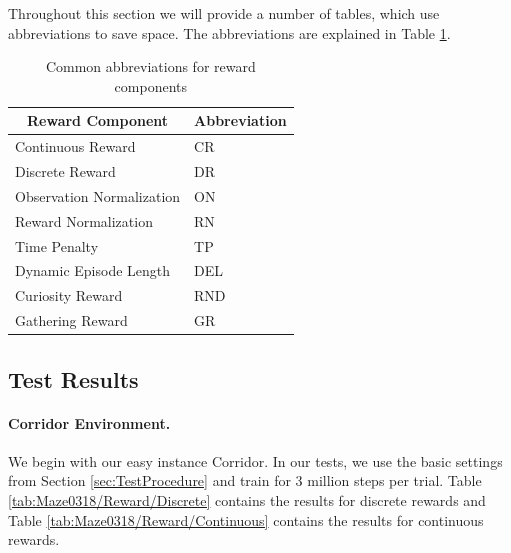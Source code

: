 Throughout this section we will provide a number of tables, which use abbreviations to save space. The abbreviations are explained in Table \ref{tab:RewardAbbreviations}.  

\begin{table} [ht]
    \begin{center}
        \small
        \begin{tabular}{ll}
            \toprule
            \multicolumn{1}{c}{Reward Component} & Abbreviation \\
            \midrule
            Continuous Reward & CR \\
            Discrete Reward & DR \\
            Observation Normalization & ON \\
            Reward Normalization & RN \\
            Time Penalty & TP \\
            Dynamic Episode Length & DEL \\
            Curiosity Reward & RND \\
            Gathering Reward & GR \\
            \bottomrule
        \end{tabular}
    \end{center}
    \caption[Abbreviations for Reward Components]{Common abbreviations for reward components} \label{tab:RewardAbbreviations}
\end{table}


\subsection{Test Results} \label{sec:RewardTestResults}

\paragraph{Corridor Environment.}
We begin with our easy instance Corridor. In our tests, we use the basic settings from Section \ref{sec:TestProcedure} and train for 3 million steps per trial. Table \ref{tab:Maze0318/Reward/Discrete} contains the results for discrete rewards and Table \ref{tab:Maze0318/Reward/Continuous} contains the results for continuous rewards.

